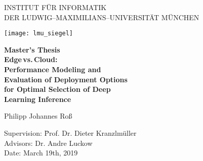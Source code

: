 \begin{center}

\vspace*{-2cm}

{\Huge INSTITUT FÜR INFORMATIK\\[1mm]}
DER LUDWIG--MAXIMILIANS--UNIVERSITÄT MÜNCHEN\\

\vspace*{1cm}

\texttt{[image: lmu\_siegel]}

\vspace*{2cm}

{\Large \textbf{Master's Thesis}}\\ %

\vspace{2.0cm}
{\Huge \textbf{Edge\,vs.\,Cloud:}}\\
\vspace*{2.0mm}
{\Huge \textbf{Performance Modeling and}}\\
\vspace*{2.0mm}
{\Huge \textbf{Evaluation of Deployment Options}}\\
 \vspace*{2.0mm}
{\Huge \textbf{for Optimal Selection of Deep}}\\
 \vspace*{2.0mm}
{\Huge \textbf{Learning Inference}}\\
\vspace{1.0cm}

{\LARGE Philipp Johannes Roß} %
\vspace{2cm}

\parbox{1cm}{
\begin{large}
\begin{tabbing}
Supervision: \hspace{.5cm} \=Prof. Dr. Dieter Kranzlmüller\\[2mm]
Advisors:
\>Dr. Andre Luckow\\[2mm]
Date: \> March 19th, 2019\\
\end{tabbing}
\end{large}}\\
\vspace{5mm}

\end{center}
